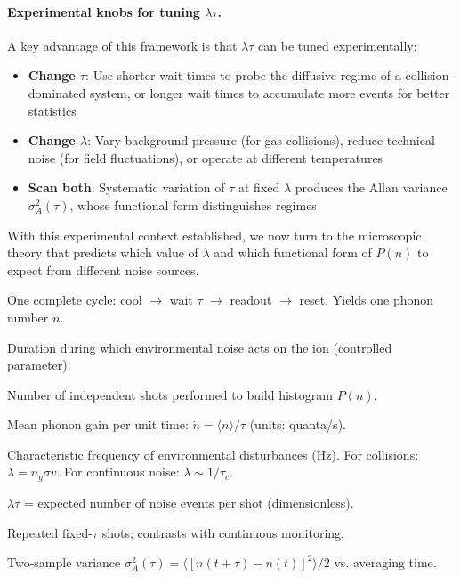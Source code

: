 \paragraph{Experimental knobs for tuning $\lambda\tau$.}
A key advantage of this framework is that $\lambda\tau$ can be tuned experimentally:
\begin{itemize}[nosep]
\item \textbf{Change $\tau$}: Use shorter wait times to probe the diffusive regime of a collision-dominated system, or longer wait times to accumulate more events for better statistics
\item \textbf{Change $\lambda$}: Vary background pressure (for gas collisions), reduce technical noise (for field fluctuations), or operate at different temperatures
\item \textbf{Scan both}: Systematic variation of $\tau$ at fixed $\lambda$ produces the Allan variance $\sigma^2_A(\tau)$, whose functional form distinguishes regimes
\end{itemize}

With this experimental context established, we now turn to the microscopic theory that predicts which value of $\lambda$ and which functional form of $P(n)$ to expect from different noise sources.

\begin{tcolorbox}[title=Experimental Terminology]
\begin{description}[leftmargin=3em,style=nextline,nosep]
\item[Shot] One complete cycle: cool $\to$ wait $\tau$ $\to$ readout $\to$ reset. Yields one phonon number $n$.
\item[Wait time $\tau$] Duration during which environmental noise acts on the ion (controlled parameter).
\item[Repetitions $N$] Number of independent shots performed to build histogram $P(n)$.
\item[Heating rate] Mean phonon gain per unit time: $\dot{n} = \langle n \rangle / \tau$ (units: quanta/s).
\item[Event rate $\lambda$] Characteristic frequency of environmental disturbances (Hz). For collisions: $\lambda = n_g \sigma v$. For continuous noise: $\lambda \sim 1/\tau_c$.
\item[Regime parameter] $\lambda\tau$ = expected number of noise events per shot (dimensionless).
\item[Stroboscopic measurement] Repeated fixed-$\tau$ shots; contrasts with continuous monitoring.
\item[Allan variance] Two-sample variance $\sigma^2_A(\tau) = \langle [n(t{+}\tau) - n(t)]^2 \rangle/2$ vs. averaging time.
\end{description}
\end{tcolorbox}